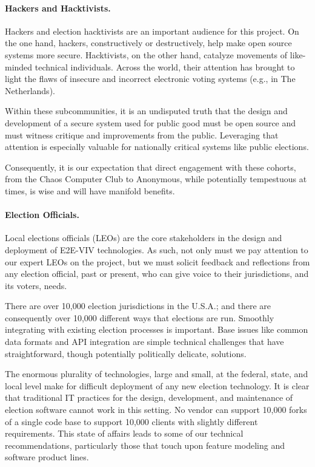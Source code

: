 \paragraph{Hackers and Hacktivists.} Hackers and election hacktivists
are an important audience for this project. On the one hand, hackers,
constructively or destructively, help make open source systems more
secure.  Hacktivists, on the other hand, catalyze movements of
like-minded technical individuals. Across the world, their attention
has brought to light the flaws of insecure and incorrect electronic
voting systems (e.g., in The Netherlands).

Within these subcommunities, it is an undisputed truth that the design
and development of a secure system used for public good must be open
source and must witness critique and improvements from the public.
Leveraging that attention is especially valuable for nationally
critical systems like public elections.

Consequently, it is our expectation that direct engagement with these
cohorts, from the Chaos Computer Club to Anonymous, while potentially
tempestuous at times, is wise and will have manifold benefits.

\paragraph{Election Officials.} Local elections officials (LEOs) are
the core stakeholders in the design and deployment of E2E-VIV
technologies.  As such, not only must we pay attention to our expert
LEOs on the project, but we must solicit feedback and reflections from
any election official, past or present, who can give voice to their
jurisdictions, and its voters, needs.

There are over 10,000 election jurisdictions in the U.S.A.; and there
are consequently over 10,000 different ways that elections are
run. Smoothly integrating with existing election processes is
important. Base issues like common data formats and API integration
are simple technical challenges that have straightforward, though
potentially politically delicate, solutions.

The enormous plurality of technologies, large and small, at the
federal, state, and local level make for difficult deployment of any
new election technology. It is clear that traditional IT practices for
the design, development, and maintenance of election software cannot
work in this setting. No vendor can support 10,000 forks of a single
code base to support 10,000 clients with slightly different
requirements. This state of affairs leads to some of our technical
recommendations, particularly those that touch upon feature modeling
and software product lines.

